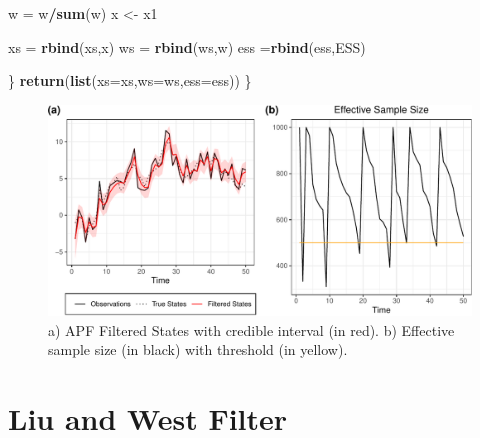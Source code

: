 \documentclass[
]{book}
\newenvironment{Shaded}{\begin{snugshade}}{\end{snugshade}}
\newcommand{\DataTypeTok}[1]{\textcolor[rgb]{0.13,0.29,0.53}{#1}}
\newcommand{\KeywordTok}[1]{\textcolor[rgb]{0.13,0.29,0.53}{\textbf{#1}}}
\newcommand{\NormalTok}[1]{#1}
\newcommand{\OperatorTok}[1]{\textcolor[rgb]{0.81,0.36,0.00}{\textbf{#1}}}
\newcommand{\StringTok}[1]{\textcolor[rgb]{0.31,0.60,0.02}{#1}}
\theoremstyle{break}
\theoremstyle{nonumberplain}
\begin{document}
\begin{Shaded}
\begin{Highlighting}[]
\NormalTok{    w   =}\StringTok{ }\NormalTok{w}\OperatorTok{/}\KeywordTok{sum}\NormalTok{(w)}
\NormalTok{    x <-}\StringTok{ }\NormalTok{x1}
   
    
\NormalTok{    xs =}\StringTok{ }\KeywordTok{rbind}\NormalTok{(xs,x)}
\NormalTok{    ws =}\StringTok{ }\KeywordTok{rbind}\NormalTok{(ws,w)}
\NormalTok{    ess =}\KeywordTok{rbind}\NormalTok{(ess,ESS)}
    
\NormalTok{  \}}
  \KeywordTok{return}\NormalTok{(}\KeywordTok{list}\NormalTok{(}\DataTypeTok{xs=}\NormalTok{xs,}\DataTypeTok{ws=}\NormalTok{ws,}\DataTypeTok{ess=}\NormalTok{ess))}
\NormalTok{\}}
\end{Highlighting}
\end{Shaded}

\begin{figure}[H]

{\centering \includegraphics{prova_knit_finale_files/figure-latex/unnamed-chunk-25-1} 

}

\caption{a) APF Filtered States with credible interval (in red). b) Effective sample size (in black) with threshold (in yellow).}\label{fig:unnamed-chunk-25}
\end{figure}

\section{Liu and West Filter}\label{pf_liu_west}
\end{document}
